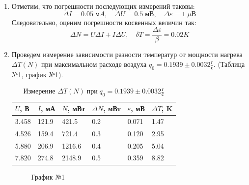 \documentclass[a4paper,12pt]{article}
\begin{document}
\begin{enumerate}
		\item Отметим, что погрешности последующих измерений таковы:
		$$\Delta I = 0.05\; мA, \quad \Delta U = 0.5 \; мВ, \quad \Delta \varepsilon = 1 \; \mu В$$
		Следовательно, оценим погрешности косвенных величин так:
		$$\Delta N = U \Delta I + I \Delta U, \quad \delta T = \dfrac{\Delta \varepsilon}{\beta} = 0.02 K$$

		\item Проведем измерение зависимости разности температур от мощности нагрева $\Delta T(N)$ при максимальном расходе воздуха $q_0 = 0.1939 \pm 0.0032 \frac{г}{с}$. (Таблица №1, график №1).

		\begin{table}[h!]
			\caption{Измерение $\Delta T (N) \; {при} \; q_0 = 0.1939 \pm 0.0032 \frac{г}{с}$}
			\begin{center}
				\begin{tabular}{|*{6}{l|}}
					\hline
					$U$, В & $I$, мА & $N$, мВт & $\Delta N$, мВт & $\varepsilon$, мВ & $\Delta T$, K\\ \hline
					3.458 & 121.9 & 421.5 & 0.2 & 0.071 & 1.47 \\ \hline
					4.526 & 159.4 & 721.4 & 0.3 & 0.120 & 2.95 \\ \hline
					5.880 & 206.9 & 1216.6 & 0.4 & 0.205 & 5.04 \\ \hline
					7.820 & 274.8 & 2148.9 & 0.5 & 0.359 & 8.82 \\ \hline
				\end{tabular}
			\end{center}
		\end{table}

		\begin{figure}[h!]
			\caption[]{\label{fig:3} График №1}
		\end{figure}


\end{enumerate}
\end{document}
